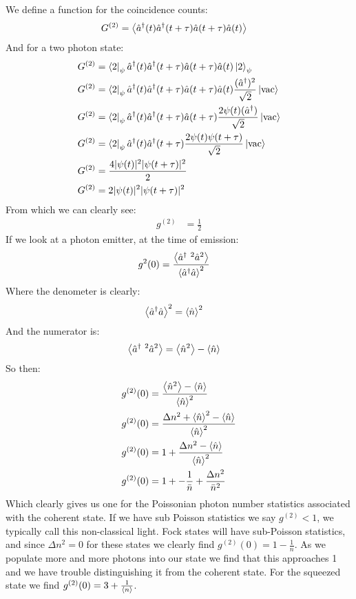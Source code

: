 We define a function for the coincidence counts:
\begin{align*}
	G^{(2)} &= \expval{\hat{a}^\dagger(t) \hat{a}^\dagger(t+\tau) \hat{a}(t+\tau)\hat{a}(t)}
\end{align*}
And for a two photon state:
\begin{align*}
	G^{(2)} &= \bra{2}_\psi\hat{a}^\dagger(t) \hat{a}^\dagger(t+\tau) \hat{a}(t+\tau)\hat{a}(t)\ket{2}_\psi \\
	G^{(2)} &= \bra{2}_\psi\hat{a}^\dagger(t) \hat{a}^\dagger(t+\tau) \hat{a}(t+\tau)\hat{a}(t)\frac{(\hat{a}^\dagger)^2}{\sqrt{2}}\ket{\text{vac}} \\
	G^{(2)} &= \bra{2}_\psi\hat{a}^\dagger(t) \hat{a}^\dagger(t+\tau) \hat{a}(t+\tau)\frac{2\psi(t)(\hat{a}^\dagger)}{\sqrt{2}}\ket{\text{vac}} \\
	G^{(2)} &= \bra{2}_\psi\hat{a}^\dagger(t) \hat{a}^\dagger(t+\tau) \frac{2\psi(t)\psi(t+\tau)}{\sqrt{2}}\ket{\text{vac}} \\
	G^{(2)} &= \frac{4|\psi(t)|^2|\psi(t+\tau)|^2}{2} \\
	G^{(2)} &= 2|\psi(t)|^2|\psi(t+\tau)|^2
\end{align*}
From which we can clearly see:
\begin{align*}
	g^{(2)} &= \frac{1}{2}
\end{align*}
If we look at a photon emitter, at the time of emission:
\begin{align*}
	g^{2}(0) &= \frac{\expval{\hat{a}^\dagger\ ^2\hat{a}^2}}{\expval{\hat{a}^\dagger\hat{a}}^2}
\end{align*}
Where the denometer is clearly:
\begin{align*}
	\expval{\hat{a}^\dagger\hat{a}}^2 &= \expval{\hat{n}}^2
\end{align*}
And the numerator is:
\begin{align*}
	\expval{\hat{a}^\dagger\ ^2\hat{a}^2} &= \expval{\hat{n}^2} - \expval{\hat{n}} 
\end{align*}
So then:
\begin{align*}
	g^{(2)}(0) &= \frac{\expval{\hat{n}^2} - \expval{\hat{n}}}{\expval{\hat{n}}^2} \\
	g^{(2)}(0) &= \frac{\Delta n^2 + \expval{\hat{n}}^2 - \expval{\hat{n}}}{\expval{\hat{n}}^2} \\
	g^{(2)}(0) &= 1 + \frac{\Delta n^2  - \expval{\hat{n}}}{\expval{\hat{n}}^2} \\
	g^{(2)}(0) &= 1 +   - \frac{1}{\bar{n}} + \frac{\Delta n^2}{\bar{n}^2}
\end{align*}
Which clearly gives us one for the Poissonian photon number statistics associated with the coherent state.
If we have sub Poisson statistics we say $g^{(2)} < 1$, we typically call this non-classical light. 
Fock states will have sub-Poisson statistics, and since $\Delta n^2 = 0$ for these states we clearly find $g^{(2)}(0) = 1 - \frac{1}{n}$.
As we populate more and more photons into our state we find that this approaches 1 and we have trouble distinguishing it from the coherent state.
For the squeezed state we find $g^{(2)}(0) = 3 + \frac{1}{\expval{n}}$.
